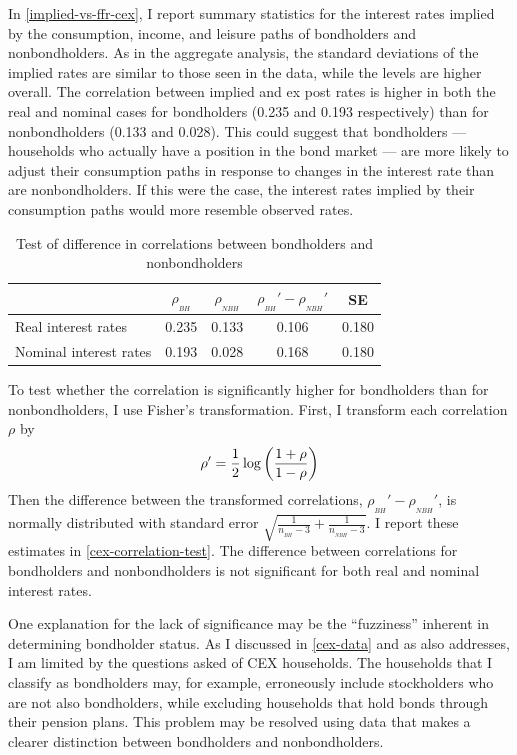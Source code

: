 In \autoref{implied-vs-ffr-cex}, I report summary statistics for the interest rates implied by the consumption, income, and leisure paths of bondholders and nonbondholders. As in the aggregate analysis, the standard deviations of the implied rates are similar to those seen in the data, while the levels are higher overall. The correlation between implied and ex post rates is higher in both the real and nominal cases for bondholders (0.235 and 0.193 respectively) than for nonbondholders (0.133 and 0.028). This could suggest that bondholders --- households who actually have a position in the bond market --- are more likely to adjust their consumption paths in response to changes in the interest rate than are nonbondholders. If this were the case, the interest rates implied by their consumption paths would more resemble observed rates.

\begin{table}[b]
\centering
\caption{Test of difference in correlations between bondholders and nonbondholders}
\label{cex-correlation-test}
\begin{tabular}{lcccc} \hline
& $\rho_{_{BH}}$ & $\rho_{_{NBH}}$ & $\rho_{_{BH}}' - \rho_{_{NBH}}'$ & SE \\ \hline
Real interest rates    & 0.235 & 0.133 & 0.106 & 0.180 \\
Nominal interest rates & 0.193 & 0.028 & 0.168 & 0.180 \\ \hline
\end{tabular}
\end{table}

To test whether the correlation is significantly higher for bondholders than for nonbondholders, I use Fisher's transformation. First, I transform each correlation $\rho$ by $$\rho' = \frac{1}{2} \log \left( \frac{1+\rho}{1-\rho} \right)$$
Then the difference between the transformed correlations, $\rho_{_{BH}}' - \rho_{_{NBH}}'$, is normally distributed with standard error $\sqrt{\frac{1}{n_{_{BH}} - 3} + \frac{1}{n_{_{NBH}} - 3}}$. I report these estimates in \autoref{cex-correlation-test}. The difference between correlations for bondholders and nonbondholders is not significant for both real and nominal interest rates.

One explanation for the lack of significance may be the ``fuzziness'' inherent in determining bondholder status. As I discussed in \autoref{cex-data} and as \cite{vissing02} also addresses, I am limited by the questions asked of CEX households. The households that I classify as bondholders may, for example, erroneously include stockholders who are not also bondholders, while excluding households that hold bonds through their pension plans. This problem may be resolved using data that makes a clearer distinction between bondholders and nonbondholders.

